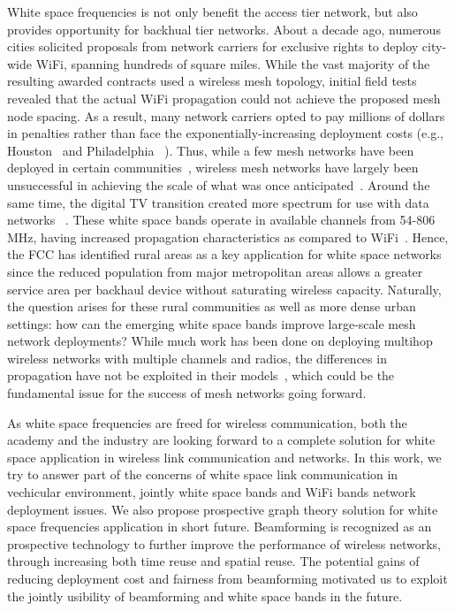 White space frequencies is not only benefit the access tier network, 
but also provides opportunity for backhual tier networks. About a 
decade ago, numerous cities solicited proposals from network carriers 
for exclusive rights to deploy city-wide WiFi, spanning hundreds of 
square miles. While the vast majority of the resulting awarded 
contracts used a wireless mesh topology, initial field tests revealed 
that the actual WiFi propagation could not achieve the proposed mesh node
spacing. As a result, many network carriers opted to pay millions of 
dollars in penalties rather than face the exponentially-increasing
deployment costs (e.g., Houston~\cite{cnet_aug07} and Philadelphia
~\cite{arstechnica_may08}). Thus, while a few mesh networks have been 
deployed in certain communities~\cite{CRSK06,google_imc08}, wireless 
mesh networks have largely been unsuccessful in achieving the scale 
of what was once anticipated~\cite{taps}. Around the same time, the 
digital TV transition created more spectrum for use with data networks
~\cite{fccwhitespace}. These white space bands operate in available 
channels from 54-806 MHz, having increased propagation characteristics 
as compared to WiFi~\cite{balanis2012antenna}. Hence, the FCC has 
identified rural areas as a key application for white space networks 
since the reduced population from major metropolitan areas allows a 
greater service area per backhaul device without saturating wireless 
capacity. Naturally, the question arises for these rural communities 
as well as more dense urban settings: how can the emerging white space 
bands improve large-scale mesh network deployments?  While much work 
has been done on deploying multihop wireless networks with multiple 
channels and radios, the differences in propagation have not be 
exploited in their models~\cite{raniwala2004centralized,tang2005interference, si2010overview}, 
which could be the fundamental issue for the success of mesh networks 
going forward.

As white space frequencies are freed for wireless communication,
both the academy and the industry are looking forward to a complete
solution for white space application in wireless link communication
and networks. In this work, we try to answer part of the concerns
of white space link communication in vechicular environment, jointly 
white space bands and WiFi bands network deployment issues. We also
propose prospective graph theory solution for white space frequencies
application in short future. Beamforming is recognized as an prospective 
technology to further improve the performance of wireless networks, 
through increasing both time reuse and spatial reuse. The potential 
gains of reducing deployment cost and fairness from beamforming 
motivated us to exploit the jointly usibility of beamforming and 
white space bands in the future.


